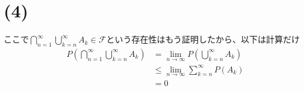 \documentclass[11pt]{article}
\newcommand{\ds}{\displaystyle}
\begin{document}
	\section*{(4)}
	ここで$\bigcap\limits_{n=1}^{\infty}\bigcup\limits_{k=n}^{\infty}A_{k}\in\mathscr{F}$という存在性はもう証明したから、以下は計算だけ
	\begin{align*}
		P\left(\bigcap\limits_{n=1}^{\infty}\bigcup\limits_{k=n}^{\infty}A_{k}\right)
		&=\ds\lim_{n\rightarrow\infty}P\left(\bigcup\limits_{k=n}^{\infty}A_{k}\right)\\
		&\leq\ds\lim_{n\rightarrow\infty}\ds\sum_{k=n}^{\infty}P\left(A_{k}\right)\\
		&=0
	\end{align*}
	
	
	
	
	
	
	
	
	
	
	
	
	
	
	
	
	
	
	
	
	
	
	
	
	
	
	
	
	
	
	
	
	
	
	
	
	
	
	\newpage
	
	
\end{document}

